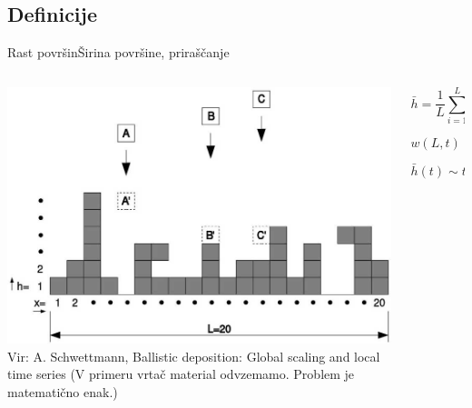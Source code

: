 \documentclass{beamer}
\begin{document}
\subsection{Definicije}

\begin{frame}{Rast površin}{Širina površine, priraščanje}
\begin{columns}
  \begin{column}{0.45\textwidth}
     \hspace*{-0.05\textwidth}\includegraphics[width=1.1\textwidth]{slike/bdep}
     \newline
     \newline
     \tiny{Vir: A. Schwettmann, Ballistic deposition: Global scaling and local time series}
     \newline \newline
     \tiny{(V primeru vrtač material odvzemamo. Problem je matematično enak.)}
  \end{column}

  \begin{column}{0.55\textwidth}
    \footnotesize
    \begin{equation} \bar{h} = \frac{1}{L} \sum_{i=1}^L h(i,t) \end{equation}
    \newline
    \begin{equation} w(L,t) = \sqrt{\frac{1}{L} \sum_{i=1}^L (h(i,t)-\bar{h}(t))^2} \end{equation}
    \newline
    \begin{equation} \bar{h}(t) \sim t \end{equation}
  \end{column}
\end{columns}
\end{frame}
\end{document}
